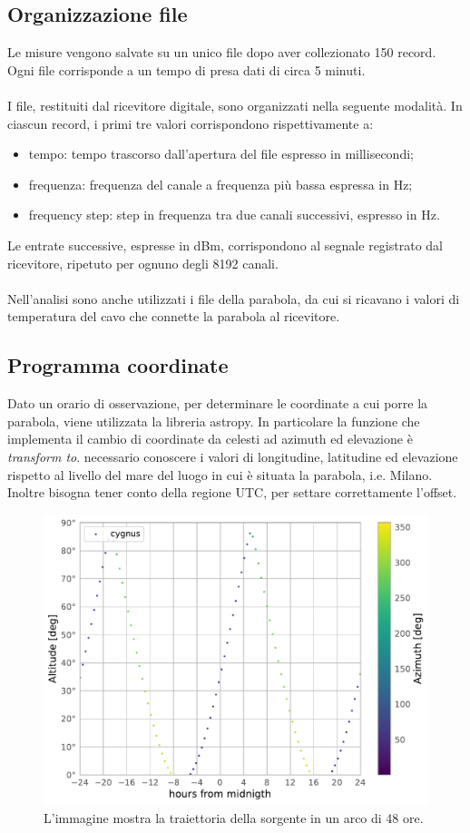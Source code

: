 \subsection{Organizzazione file}
Le misure vengono salvate su un unico file dopo aver collezionato 150 record. Ogni file corrisponde a un tempo di presa dati di circa 5 minuti.
\\\\
I file, restituiti dal ricevitore digitale, sono organizzati nella seguente modalità. In ciascun record, i primi tre valori corrispondono rispettivamente a:
\begin{itemize}
\item tempo: tempo trascorso dall'apertura del file espresso in millisecondi;
\item frequenza: frequenza del canale a frequenza più bassa espressa in Hz;
\item frequency step: step in frequenza tra due canali successivi, espresso in Hz.
\end{itemize}
Le entrate successive, espresse in dBm, corrispondono al segnale registrato dal ricevitore, ripetuto per ognuno degli 8192 canali.
\\\\
Nell'analisi sono anche utilizzati i file della parabola, da cui si ricavano i valori di temperatura del cavo che connette la parabola al ricevitore. %


\subsection{Programma coordinate}
Dato un orario di osservazione, per determinare le coordinate a cui porre la parabola, viene utilizzata la libreria astropy. In particolare la funzione che implementa il cambio di coordinate da celesti ad azimuth ed elevazione è \textit{transform to}.  necessario conoscere i valori di longitudine, latitudine ed elevazione rispetto al livello del mare del luogo in cui è situata la parabola, i.e. Milano. Inoltre bisogna tener conto della regione UTC, per settare correttamente l'offset. 

\begin{figure}[h]
\includegraphics[scale=0.60]{Coordinate.pdf}
\centering
\caption{L'immagine mostra la traiettoria della sorgente in un arco di 48 ore.}
\label{fig:Coordinate}
\end{figure}
